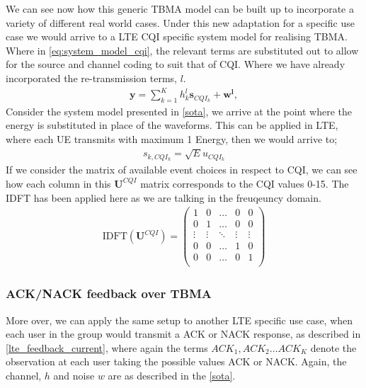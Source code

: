 \documentclass{article}
\begin{document}
We can see now how this generic \ac{TBMA} model can be built up to incorporate a variety of different real world cases. Under this new adaptation for a specific use case we would arrive to a LTE CQI specific system model for realising \ac{TBMA}. Where in \cref{eq:system_model_cqi}, the relevant terms are substituted out to allow for the source and channel coding to suit that of \ac{CQI}. Where we have already incorporated the re-transmission terms, $l$. 
\begin{align}
    \boldsymbol{y} = \sum_{k=1}^K h_k^l \boldsymbol{s}_{CQI_k} + \boldsymbol{w^l}, \label{eq:system_model_cqi}
\end{align}
Consider the system model presented in \cref{sota}, we arrive at the point where the energy is substituted in place of the waveforms. This can be applied in LTE, where each \ac{UE} transmits with maximum 1 Energy, then we would arrive to;
\begin{align}
    s_{k,CQI_k} = \sqrt{E}u_{CQI_k}
\end{align}
If we consider the matrix of available event choices in respect to CQI, we can see how each column in this $\textbf{U}^{CQI}$ matrix corresponds to the CQI values 0-15. The IDFT has been applied here as we are talking in the freuqeuncy domain.
\begin{align}
    \text{IDFT}(\boldsymbol{U}^{CQI}) = 
    \begin{pmatrix}
     1 & 0 & \hdots & 0 & 0\\
    0 & 1 & \hdots & 0 & 0 \\
    \vdots & \vdots & \ddots & \vdots & \vdots \\
    0 & 0 & \hdots & 1 & 0 \\
    0 & 0 & \hdots & 0 & 1 \\
    \end{pmatrix}
    \label{fig:sig_mat_cqi}
\end{align}

\subsubsection{ACK/NACK feedback over TBMA}\label{data_models}

More over, we can apply the same setup to another LTE specific use case, when each user in the group would transmit a ACK or NACK response, as described in \cref{lte_feedback_current}, where again the terms $ACK_{1},ACK_{2} \dots ACK_{K}$ denote the observation at each user taking the possible values ACK or NACK. Again, the channel, $h$ and noise $w$ are as described in the \cref{sota}.
\end{document}
